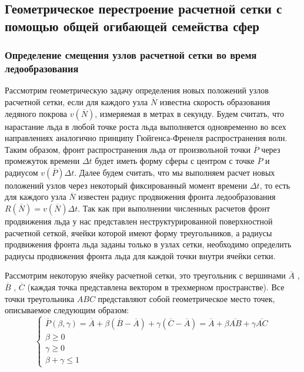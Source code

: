 \subsection{Геометрическое перестроение расчетной сетки с помощью общей огибающей семейства сфер}

\subsubsection{Определение смещения узлов расчетной сетки во время ледообразования}

Рассмотрим геометрическую задачу определения новых положений узлов расчетной сетки, если для каждого узла $\overline{N}$ известна скорость образования ледяного покрова $v(\overline{N})$, измеряемая в метрах в секунду.
Будем считать, что нарастание льда в любой точке роста льда выполняется одновременно во всех направлениях аналогично принципу Гюйгенса-Френеля распространения волн.
Таким образом, фронт распространения льда от произвольной точки $\overline{P}$ через промежуток времени $\Delta t$ будет иметь форму сферы с центром с точке $\overline{P}$ и радиусом $v(\overline{P})\Delta t$.
Далее будем считать, что мы выполняем расчет новых положений узлов через некоторый фиксированный момент времени $\Delta t$, то есть для каждого узла $\overline{N}$ известен радиус продвижения фронта ледообразования $R(\overline{N}) = v(\overline{N}) \Delta t$.
Так как при выполнении численных расчетов фронт продвижения льда у нас представлен неструктурированной поверхностной расчетной сеткой, ячейки которой имеют форму треугольников, а радиусы продвижения фронта льда заданы только в узлах сетки, необходимо определить радиусы продвижения фронта льда для каждой точки внутри ячейки сетки.

Рассмотрим некоторую ячейку расчетной сетки, это треугольник с вершинами $\overline{A}$ , $\overline{B}$ , $\overline{C}$ (каждая точка представлена вектором в трехмерном пространстве).
Все точки треугольника $ABC$ представляют собой геометрическое место точек, описываемое следующим образом:
\begin{equation}
	\left\{
		\begin{aligned}
			\overline{P}(\beta, \gamma) = \overline{A} + \beta(\overline{B} - \overline{A}) + \gamma(\overline{C} - \overline{A}) = \overline{A} + \beta \overline{AB} + \gamma \overline{AC} \\
			\beta \ge 0 \\
			\gamma \ge 0 \\
			\beta + \gamma \le 1
		\end{aligned}
	\right.
\end{equation}

